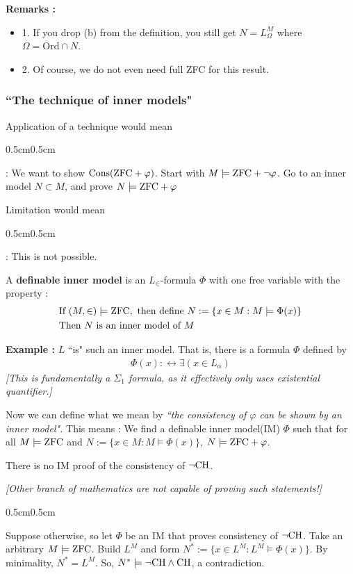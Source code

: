 \documentclass[12pt,a4paper]{article}
\newenvironment{proof}
{\begin{changemargin}{0.5cm}{0.5cm} 
	}%
	{\end{changemargin}
}
\newenvironment{subproof}
{\begin{changemargin}{0.5cm}{0.5cm} 
	}%
	{\end{changemargin}
}
\renewenvironment{i}
{\begin{itemize} 
	}%
	{\end{itemize}
}
\newenvironment{p}
{\begin{proof} 
	}%
	{\end{proof}
}
\begin{document}
\textbf{Remarks :}
\begin{i}
\item[1.] If you drop (b) from the definition, you still get $N = L_{\Omega}^M$ where $\Omega = \text{Ord} \cap N$.
\item[2.] Of course, we do not even need full ZFC for this result.
\end{i}
\s

\subsubsection*{``The technique of inner models"}

Application of a technique would mean
\begin{subproof}
: We want to show $\text{Cons} (\text{ZFC} + \varphi)$. Start with $M \models \text{ZFC} + \neg \varphi$. Go to an inner model $N\subset M$, and prove $N \models \text{ZFC} + \varphi$
\end{subproof}
Limitation would mean
\begin{subproof}
: This is not possible.
\end{subproof}
\s

 A \textbf{definable inner model} is an $L_{\in}$-formula $\Phi$ with one free variable with the property :
\begin{align*}
&\text{If } (M, \in) \models \text{ZFC}, \text{ then define } N:= \{x\in M : M \models \Phi(x) \} \\
&\text{Then } N \text{ is an inner model of }M
\end{align*}
\s

\textbf{Example :} $L$ ``is" such an inner model. That is, there is a formula $\Phi$ defined by
\begin{align*}
\Phi(x) :\leftrightarrow \exists (x\in L_{\alpha})
\end{align*}
\emph{[This is fundamentally a $\Sigma_1$ formula, as it effectively only uses existential quantifier.]}
\s

Now we can define what we mean by \emph{``the consistency of $\varphi$ can be shown by an inner model".} This means : We find a definable inner model(IM) $\Phi$ such that for all $M\models \text{ZFC}$ and $N:= \{x\in M : M\models \Phi(x) \}$, $N\models \text{ZFC} + \varphi$.
\s

\corr There is no IM proof of the consistency of $\neg \text{CH}$.

\emph{[Other branch of mathematics are not capable of proving such statements!]}
\begin{p}
\pf Suppose otherwise, so let $\Phi$ be an IM that proves consistency of $\neg \text{CH}$. Take an arbitrary $M\models \text{ZFC}$. Build $L^M$ and form $N^* := \{x\in L^M : L^M \models \Phi(x)\}$. By minimality, $N^* = L^M$. So, $N^* \models \neg \text{CH} \wedge \text{CH}$, a contradiction.

\eop
\end{p}
\s
\end{document}
